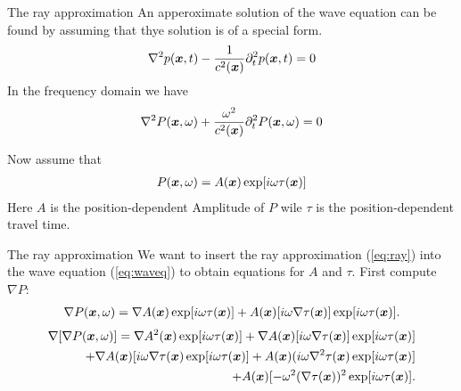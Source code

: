 \documentclass[xcolor=dvipsnames,notes]{beamer}
\begin{document}
\begin{frame}{The ray approximation}
An apperoximate solution of the wave equation can be
found by assuming that thye solution is of a special form.
%
\begin{eqnarray}
\nabla^2 p(\mbox{\boldmath $x$},t) - \frac{1}{c^2(\mbox{\boldmath $x$})}\partial^2_t p(\mbox{\boldmath $x$},t) = 0
\end{eqnarray}
%
In the frequency domain we have
\begin{eqnarray}
\nabla^2 P(\mbox{\boldmath $x$},\omega) + \frac{\omega^2}{c^2(\mbox{\boldmath $x$})}\partial^2_t P(\mbox{\boldmath $x$},\omega) = 0
                                 \label{eq:waveq}
\end{eqnarray}

Now assume that
\begin{eqnarray}
  P(\mbox{\boldmath $x$},\omega) = A(\mbox{\boldmath $x$})\exp[i\omega\tau(\mbox{\boldmath $x$})]
                      \label{eq:ray}
\end{eqnarray}  
Here $A$ is the position-dependent Amplitude of $P$ 
wile $\tau$ is the position-dependent travel time.
\end{frame}
\begin{frame}{The ray approximation}
We want to insert the ray approximation (\eqref{eq:ray}) into
the wave equation (\eqref{eq:waveq}) to obtain equations for $A$ and $\tau$.
First compute $\nabla P$:
\begin{eqnarray}
\nabla P(\mbox{\boldmath $x$},\omega) = \nabla A(\mbox{\boldmath $x$})\exp[i\omega\tau(\mbox{\boldmath $x$})] 
		       + A(\mbox{\boldmath $x$})[i\omega\nabla\tau(\mbox{\boldmath $x$})]\exp[i\omega\tau(\mbox{\boldmath $x$})].
\end{eqnarray}
\begin{eqnarray}
\nabla[\nabla P(\mbox{\boldmath $x$},\omega)] = \nabla A^2(\mbox{\boldmath $x$})\exp[i\omega\tau(\mbox{\boldmath $x$})] 
                             + \nabla A(\mbox{\boldmath $x$})[i\omega\nabla\tau(\mbox{\boldmath $x$})]\exp[i\omega\tau(\mbox{\boldmath $x$})] \nonumber\\
                             + \nabla A(\mbox{\boldmath $x$})[i\omega\nabla\tau(\mbox{\boldmath $x$})\exp[i\omega\tau(\mbox{\boldmath $x$})] 
                             + A(\mbox{\boldmath $x$})(i\omega\nabla^2\tau(\mbox{\boldmath $x$})\exp[i\omega\tau(\mbox{\boldmath $x$})]       \nonumber \\
                             + A(\mbox{\boldmath $x$})[-\omega^2(\nabla\tau(\mbox{\boldmath $x$}))^2\exp[i\omega\tau(\mbox{\boldmath $x$})].
\end{eqnarray}
\end{frame}
\end{document}
